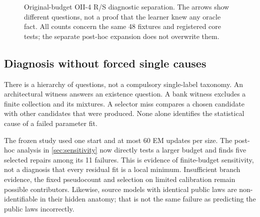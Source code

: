 \begin{figure}[tbp]
\centering
{}
\caption{Original-budget OII-4 R/S diagnostic separation. The arrows show different questions, not a proof that the learner knew any oracle fact. All counts concern the same 48 fixtures and registered core tests; the separate post-hoc expansion does not overwrite them.}
\label{fig:capacity}
\end{figure}



\subsection{Diagnosis without forced single causes}
There is a hierarchy of questions, not a compulsory single-label taxonomy. An architectural witness answers an existence question. A bank witness excludes a finite collection and its mixtures. A selector miss compares a chosen candidate with other candidates that were produced. None alone identifies the statistical cause of a failed parameter fit.

The frozen study used one start and at most 60 EM updates per size. The post-hoc analysis in \cref{sec:sensitivity} now directly tests a larger budget and finds five selected repairs among its 11 failures. This is evidence of finite-budget sensitivity, not a diagnosis that every residual fit is a local minimum. Insufficient branch evidence, the fixed pseudocount and selection on limited calibration remain possible contributors. Likewise, source models with identical public laws are non-identifiable in their hidden anatomy; that is not the same failure as predicting the public laws incorrectly.


